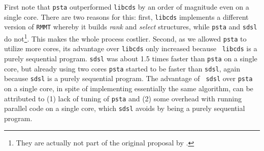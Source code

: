 First note that {\tt psta} outperformed {\tt libcds} by an order of
magnitude even on a single core. There are two reasons for this:
first, \verb+libcds+ implements a different version of \verb+RMMT+
whereby it builds {\em rank} and {\em select} structures, while
\verb+psta+ and \verb+sdsl+ do not\footnote{They are actually not part
  of the original proposal by
  \cite{Navarro:2014:FFS:2620785.2601073}.}. This makes the whole
process costlier. Second, as we allowed {\tt psta} to utilize more
cores, its advantage over {\tt libcds} only increased because {\tt
  libcds} is a purely sequential program.  {\tt sdsl} was about 1.5
times faster than {\tt psta} on a single core, but already using two
cores {\tt psta} started to be faster than {\tt sdsl}, again because
{\tt sdsl} is a purely sequential program.  The advantage of {\tt
  sdsl} over {\tt psta} on a single core, in spite of implementing
essentially the same algorithm, can be attributed to (1) lack of
tuning of {\tt psta} and (2) some overhead with running parallel code
on a single core, which {\tt sdsl} avoids by being a purely sequential
program.
%

